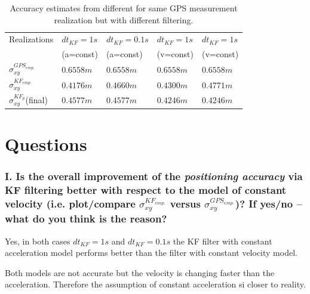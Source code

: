 \documentclass{article}
\begin{document}


\begin{table}[h]
\centering
\begin{tabular}{lllll}
Realizations  & $dt_{KF} = 1\si{s}$ & $dt_{KF} = 0.1\si{s}$ & $dt_{KF} = 1\si{s}$ & $dt_{KF} = 1\si{s}$\\
& (a=const)& (a=const) & (v=const) & (v=const)\\
\hline
$\sigma_{xy}^{GPS_{emp.}}$ & $0.6558 \si{m}$ & $0.6558 \si{m}$ & $0.6558 \si{m}$ & $0.6558 \si{m}$ \\
$\sigma_{xy}^{KF_{emp.}}$  & $0.4176 \si{m}$ & $0.4660 \si{m}$ & $0.4300 \si{m}$ & $0.4771 \si{m}$ \\
$\sigma_{xy}^{KF_{p}}$(final) & $0.4577 \si{m}$ & $0.4577 \si{m}$ & $0.4246 \si{m}$ & $0.4246 \si{m}$
\end{tabular}
\caption{Accuracy estimates from different for same GPS measurement realization but with different filtering.}
\label{tab:std_dev}
\end{table}

\section*{Questions}

\subsubsection*{I. Is the overall improvement of the \textit{positioning accuracy} via KF filtering better with
respect to the model of constant velocity (i.e. plot/compare $\sigma_{xy}^{KF_{emp.}}$ versus $\sigma_{xy}^{GPS_{emp.}}$)?
If yes/no – what do you think is the reason?}

Yes, in both cases $dt_{KF} = 1\si{s}$ and $dt_{KF} = 0.1\si{s}$ the KF filter
with constant acceleration model performs better than the filter with
constant velocity model.

Both models are not accurate but the velocity is changing faster than the acceleration.
Therefore the assumption of constant acceleration si closer to reality.
\end{document}

